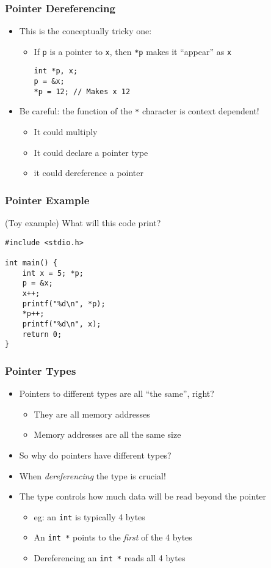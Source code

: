 \documentclass[14pt]{beamer}
\begin{document}
\begin{frame}[fragile]
\frametitle{Pointer Dereferencing}
\begin{itemize}
\item This is the conceptually tricky one:
	\begin{itemize}
		\item If \texttt{p} is a pointer to \texttt{x}, then \texttt{*p} makes it ``appear'' as \texttt{x}
		\begin{lstlisting}[style=CStyle]
int *p, x;
p = &x;
*p = 12; // Makes x 12
\end{lstlisting}
	\end{itemize}
\item Be careful: the function of the \texttt{*} character is context dependent!
	\begin{itemize}
		\item It could multiply
		\item It could declare a pointer type
		\item it could dereference a pointer
	\end{itemize}
\end{itemize}
\end{frame}

\begin{frame}[fragile]
\frametitle{Pointer Example}
(Toy example) What will this code print?
\begin{lstlisting}[style=CStyle]
#include <stdio.h>

int main() {
	int x = 5; *p;
	p = &x;
	x++;
	printf("%d\n", *p);
	*p++;
	printf("%d\n", x);
	return 0;
}
\end{lstlisting}
\end{frame}

\begin{frame}
\frametitle{Pointer Types}
\begin{itemize}
\item Pointers to different types are all ``the same'', right?
	\begin{itemize}
		\item They are all memory addresses
		\item Memory addresses are all the same size
	\end{itemize}
\pause
\item So why do pointers have different types?
\pause
\item When \textit{dereferencing} the type is crucial!
\item The type controls how much data will be read beyond the pointer
	\begin{itemize}
		\item eg: an \texttt{int} is typically 4 bytes
		\item An \texttt{int *} points to the \textit{first} of the 4 bytes
		\item Dereferencing an \texttt{int *} reads all 4 bytes
	\end{itemize}
\end{itemize}
\end{frame}
\end{document}
